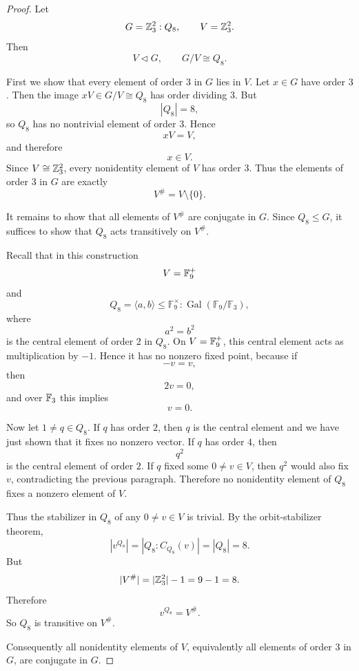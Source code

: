 \begin{proof}
    Let
    \[
        G=\mathbb{Z}_3^2:Q_8,
        \qquad
        V=\mathbb{Z}_3^2.
    \]
    Then
    \[
        V\lhd G,
        \qquad
        G/V\cong Q_8.
    \]
    
    First we show that every element of order \(3\) in \(G\) lies in \(V\). Let \(x\in G\) have order \(3\). Then the image \(xV\in G/V\cong Q_8\) has order dividing \(3\). But
    \[
        |Q_8|=8,
    \]
    so \(Q_8\) has no nontrivial element of order \(3\). Hence
    \[
        xV=V,
    \]
    and therefore
    \[
        x\in V.
    \]
    Since \(V\cong \mathbb{Z}_3^2\), every nonidentity element of \(V\) has order \(3\). Thus the elements of order \(3\) in \(G\) are exactly
    \[
        V^\#=V\setminus\{0\}.
    \]
    
    It remains to show that all elements of \(V^\#\) are conjugate in \(G\). Since \(Q_8\leq G\), it suffices to show that \(Q_8\) acts transitively on \(V^\#\).
    
    Recall that in this construction
    \[
        V=\mathbb{F}_9^+
    \]
    and
    \[
        Q_8=\langle a,b\rangle\leq \mathbb{F}_9^\times:\operatorname{Gal}(\mathbb{F}_9/\mathbb{F}_3),
    \]
    where
    \[
        a^2=b^2
    \]
    is the central element of order \(2\) in \(Q_8\). On \(V=\mathbb{F}_9^+\), this central element acts as multiplication by \(-1\). Hence it has no nonzero fixed point, because if
    \[
        -v=v,
    \]
    then
    \[
        2v=0,
    \]
    and over \(\mathbb{F}_3\) this implies
    \[
        v=0.
    \]
    
    Now let \(1\neq q\in Q_8\). If \(q\) has order \(2\), then \(q\) is the central element and we have just shown that it fixes no nonzero vector. If \(q\) has order \(4\), then
    \[
        q^2
    \]
    is the central element of order \(2\). If \(q\) fixed some \(0\neq v\in V\), then \(q^2\) would also fix \(v\), contradicting the previous paragraph. Therefore no nonidentity element of \(Q_8\) fixes a nonzero element of \(V\).
    
    Thus the stabilizer in \(Q_8\) of any \(0\neq v\in V\) is trivial. By the orbit-stabilizer theorem,
    \[
        |v^{Q_8}|
        =
        |Q_8:C_{Q_8}(v)|
        =
        |Q_8|
        =
        8.
    \]
    But
    \[
        |V^\#|=|\mathbb{Z}_3^2|-1=9-1=8.
    \]
    Therefore
    \[
        v^{Q_8}=V^\#.
    \]
    So \(Q_8\) is transitive on \(V^\#\).
    
    Consequently all nonidentity elements of \(V\), equivalently all elements of order \(3\) in \(G\), are conjugate in \(G\).
    \end{proof}

